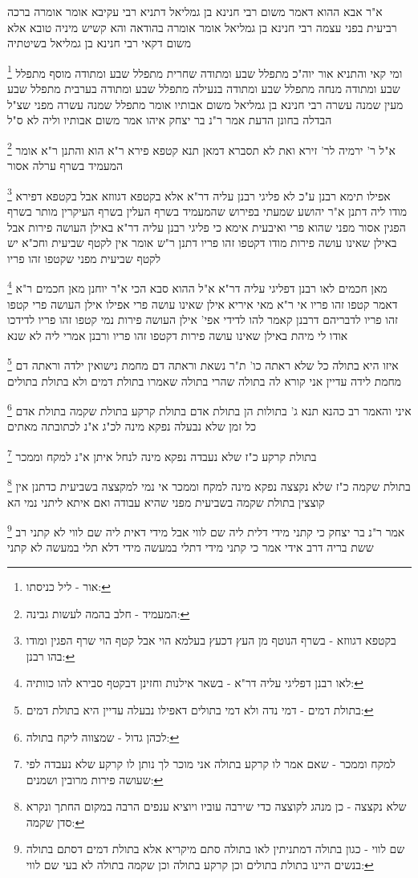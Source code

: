 \documentclass[12pt, openany]{book}
\newcommand{\footnotecomment}[1]{
	\renewcommand\thefootnote{}
	\footnote{#1}}
\newcommand{\commenta}[1]{\footnotecomment{#1}}
\begin{document}
{{א"ר אבא ההוא דאמר משום רבי חנינא בן גמליאל דתניא רבי עקיבא אומר אומרה ברכה רביעית בפני עצמה רבי חנינא בן גמליאל אומר אומרה בהודאה
והא קשיש מיניה טובא אלא משום דקאי רבי חנינא בן גמליאל בשיטתיה 
\commenta{אור - ליל כניסתו:}
ומי קאי והתניא אור יוה"כ מתפלל שבע ומתודה שחרית מתפלל שבע ומתודה מוסף מתפלל שבע ומתודה מנחה מתפלל שבע ומתודה בנעילה מתפלל שבע ומתודה בערבית מתפלל שבע מעין שמנה עשרה 
רבי חנינא בן גמליאל משום אבותיו אומר מתפלל שמנה עשרה מפני שצ"ל הבדלה בחונן הדעת אמר ר"נ בר יצחק איהו אמר משום אבותיו וליה לא ס"ל 
\commenta{המעמיד - חלב בהמה לעשות גבינה:}
א"ל ר' ירמיה לר' זירא ואת לא תסברא דמאן תנא קטפא פירא ר"א הוא והתנן ר"א אומר המעמיד בשרף ערלה אסור 
\commenta{בקטפא דגווזא - בשרף הנוטף מן העץ דכעץ בעלמא הוי אבל קטף הוי שרף הפגין ומודו בהו רבנן:}
אפילו תימא רבנן ע"כ לא פליגי רבנן עליה דר"א אלא בקטפא דגווזא אבל בקטפא דפירא מודו ליה דתנן א"ר יהושע שמעתי בפירוש שהמעמיד בשרף העלין בשרף העיקרין מותר בשרף הפגין אסור מפני שהוא פרי 
ואיבעית אימא כי פליגי רבנן עליה דר"א באילן העושה פירות אבל באילן שאינו עושה פירות מודו דקטפו זהו פריו דתנן ר"ש אומר אין לקטף שביעית וחכ"א יש לקטף שביעית מפני שקטפו זהו פריו 
\commenta{לאו רבנן דפליגי עליה דר"א - בשאר אילנות וחזינן דבקטף סבירא להו כוותיה:}
מאן חכמים לאו רבנן דפליגי עליה דר"א א"ל ההוא סבא הכי א"ר יוחנן מאן חכמים ר"א דאמר קטפו זהו פריו 
אי ר"א מאי איריא אילן שאינו עושה פרי אפילו אילן העושה פרי קטפו זהו פריו לדבריהם דרבנן קאמר להו לדידי אפי' אילן העושה פירות נמי קטפו זהו פריו לדידכו אודו לי מיהת באילן שאינו עושה פירות דקטפו זהו פריו ורבנן אמרי ליה לא שנא
\commenta{בתולת דמים - דמי נדה ולא דמי בתולים דאפילו נבעלה עדיין היא בתולת דמים:}
איזו היא בתולה כל שלא ראתה כו' ת"ר נשאת וראתה דם מחמת נישואין ילדה וראתה דם מחמת לידה עדיין אני קורא לה בתולה שהרי בתולה שאמרו בתולת דמים ולא בתולת בתולים 
\commenta{לכהן גדול - שמצווה ליקח בתולה:}
איני והאמר רב כהנא תנא ג' בתולות הן בתולת אדם בתולת קרקע בתולת שקמה בתולת אדם כל זמן שלא נבעלה נפקא מינה לכ"ג א"נ לכתובתה מאתים 
\commenta{למקח וממכר - שאם אמר לו קרקע בתולה אני מוכר לך נותן לו קרקע שלא נעבדה לפי שעושה פירות מרובין ושמנים:}
בתולת קרקע כ"ז שלא נעבדה נפקא מינה לנחל איתן א"נ למקח וממכר 
\commenta{שלא נקצצה - כן מנהג לקוצצה כדי שירבה עוביו ויוציא ענפים הרבה במקום החתך ונקרא סדן שקמה:}
בתולת שקמה כ"ז שלא נקצצה נפקא מינה למקח וממכר אי נמי למקצצה בשביעית כדתנן אין קוצצין בתולת שקמה בשביעית מפני שהיא עבודה ואם איתא ליתני נמי הא 
\commenta{שם לווי - כגון בתולה דמתניתין לאו בתולה סתם מיקריא אלא בתולת דמים דסתם בתולה בנשים היינו בתולת בתולים וכן קרקע בתולה וכן שקמה בתולה לא בעי שם לווי:}
אמר ר"נ בר יצחק כי קתני מידי דלית ליה שם לווי אבל מידי דאית ליה שם לווי לא קתני רב ששת בריה דרב אידי אמר כי קתני מידי דתלי במעשה מידי דלא תלי במעשה לא קתני 
}}
\end{document}
